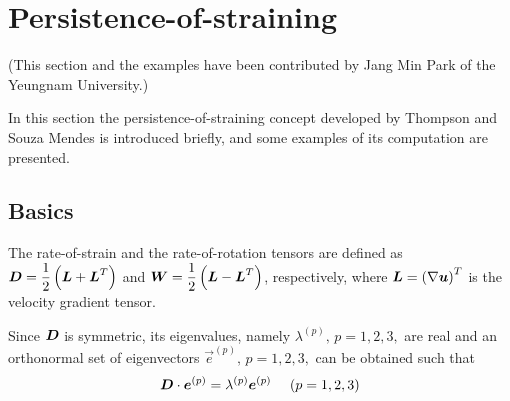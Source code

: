 
\def\headdate{14th October 2021}

\section{Persistence-of-straining}

(This section and the examples have been contributed by Jang Min Park of the Yeungnam University.)\medskip

In this section the persistence-of-straining concept
developed by Thompson and Souza Mendes \cite{Thompson2005}
is introduced briefly,
and some examples of its computation are presented.

\subsection{Basics}
\label{sec:persist_basic}
The rate-of-strain and the rate-of-rotation tensors are
defined as 
$\boldsymbol{D} = \dfrac{1}{2} \left( \boldsymbol{L} + \boldsymbol{L}^T \right)$ and
$\boldsymbol{W} = \dfrac{1}{2} \left( \boldsymbol{L} - \boldsymbol{L}^T \right)$, respectively,
where
$\boldsymbol{L}= \left( \nabla \boldsymbol{u} \right)^T$ is the velocity gradient tensor.

Since $\boldsymbol{D}$ is symmetric, 
its eigenvalues, namely $\lambda^{(p)}, \, p=1, 2, 3,$ are real
and an orthonormal set of eigenvectors 
$\vec{e}^{(p)}, \, p = 1, 2, 3,$ can be obtained such that
\begin{equation}
\boldsymbol{D} \cdot \boldsymbol{e}^{(p)} =
\lambda^{(p)} \boldsymbol{e}^{(p)}
\quad \,
\left( p = 1, 2, 3 \right)
\end{equation}

